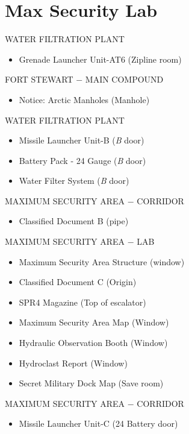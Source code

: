 \chapter{Max Security Lab}

\begin{subregion}{WATER FILTRATION PLANT}
    \begin{itemize}
        \item Grenade Launcher Unit-AT6 (Zipline room)
    \end{itemize}
\end{subregion}

\begin{subregion}{FORT STEWART $\boldsymbol{-}$ MAIN COMPOUND}
    \begin{itemize}
        \item Notice: Arctic Manholes (Manhole)
    \end{itemize}
\end{subregion}

\begin{subregion}{WATER FILTRATION PLANT}
    \begin{itemize}
        \item Missile Launcher Unit-B (\emph{B} door)
        \item Battery Pack - 24 Gauge (\emph{B} door)
        \item Water Filter System (\emph{B} door)
    \end{itemize}
\end{subregion}

\begin{subregion}{MAXIMUM SECURITY AREA $\boldsymbol{-}$ CORRIDOR}
    \begin{itemize}
        \item Classified Document B (pipe)
    \end{itemize}
\end{subregion}

\begin{subregion}{MAXIMUM SECURITY AREA $\boldsymbol{-}$ LAB}
    \begin{itemize}
        \item Maximum Security Area Structure (window)
        \item Classified Document C (Origin)
        \item SPR4 Magazine (Top of escalator)
        \item Maximum Security Area Map (Window)
        \item Hydraulic Observation Booth (Window)
        \item Hydroclast Report (Window)
        \item Secret Military Dock Map (Save room)
    \end{itemize}
\end{subregion}

\begin{subregion}{MAXIMUM SECURITY AREA $\boldsymbol{-}$ CORRIDOR}
    \begin{itemize}
        \item Missile Launcher Unit-C (24 Battery door)
    \end{itemize}
\end{subregion}
